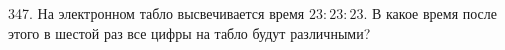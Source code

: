 347. На электронном табло высвечивается время $23:23:23.$ В какое время после этого в шестой раз все цифры на табло будут различными?\\
